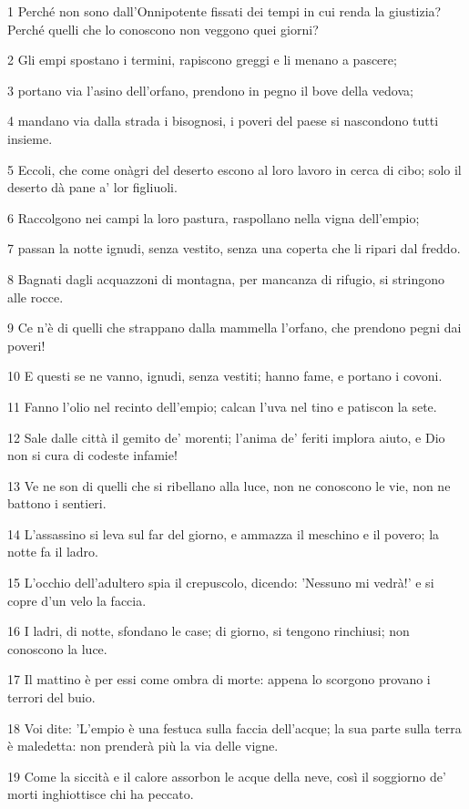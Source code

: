 \par 1 Perché non sono dall'Onnipotente fissati dei tempi in cui renda la giustizia? Perché quelli che lo conoscono non veggono quei giorni?
\par 2 Gli empi spostano i termini, rapiscono greggi e li menano a pascere;
\par 3 portano via l'asino dell'orfano, prendono in pegno il bove della vedova;
\par 4 mandano via dalla strada i bisognosi, i poveri del paese si nascondono tutti insieme.
\par 5 Eccoli, che come onàgri del deserto escono al loro lavoro in cerca di cibo; solo il deserto dà pane a' lor figliuoli.
\par 6 Raccolgono nei campi la loro pastura, raspollano nella vigna dell'empio;
\par 7 passan la notte ignudi, senza vestito, senza una coperta che li ripari dal freddo.
\par 8 Bagnati dagli acquazzoni di montagna, per mancanza di rifugio, si stringono alle rocce.
\par 9 Ce n'è di quelli che strappano dalla mammella l'orfano, che prendono pegni dai poveri!
\par 10 E questi se ne vanno, ignudi, senza vestiti; hanno fame, e portano i covoni.
\par 11 Fanno l'olio nel recinto dell'empio; calcan l'uva nel tino e patiscon la sete.
\par 12 Sale dalle città il gemito de' morenti; l'anima de' feriti implora aiuto, e Dio non si cura di codeste infamie!
\par 13 Ve ne son di quelli che si ribellano alla luce, non ne conoscono le vie, non ne battono i sentieri.
\par 14 L'assassino si leva sul far del giorno, e ammazza il meschino e il povero; la notte fa il ladro.
\par 15 L'occhio dell'adultero spia il crepuscolo, dicendo: 'Nessuno mi vedrà!' e si copre d'un velo la faccia.
\par 16 I ladri, di notte, sfondano le case; di giorno, si tengono rinchiusi; non conoscono la luce.
\par 17 Il mattino è per essi come ombra di morte: appena lo scorgono provano i terrori del buio.
\par 18 Voi dite: 'L'empio è una festuca sulla faccia dell'acque; la sua parte sulla terra è maledetta: non prenderà più la via delle vigne.
\par 19 Come la siccità e il calore assorbon le acque della neve, così il soggiorno de' morti inghiottisce chi ha peccato.
